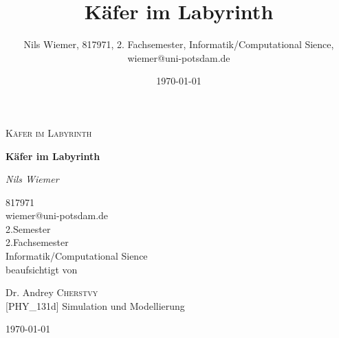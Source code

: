 \documentclass[12pt, a4paper, titlepage]{article}
\title{Käfer im Labyrinth}
\author{Nils Wiemer, 817971, 2. Fachsemester, Informatik/Computational Sience, wiemer@uni-potsdam.de}
\date{\today}
\begin{document}
\begin{titlepage}
	\centering
	{\Large \textsc{Käfer im Labyrinth}\par}
	\vspace{1.5cm}
	{\huge\bfseries Käfer im Labyrinth\par}
	\vspace{2cm}
	{\Large\itshape Nils Wiemer\par}
	\vspace{1cm}
	817971\\
	wiemer@uni-potsdam.de\\
	2.Semester\\
	2.Fachsemester\\
	Informatik/Computational Sience\\
	\vfill
	beaufsichtigt von\par
	Dr. Andrey \textsc{Cherstvy}\\
	{[PHY\_131d]} Simulation und Modellierung

	\vfill

	{\large \today\par}
\end{titlepage}








\end{document}
